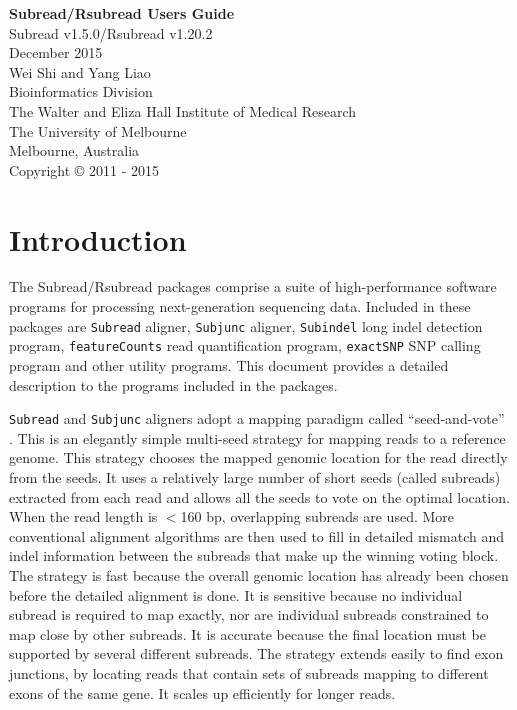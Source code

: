 \documentclass[12pt]{report}
\newcommand{\code}[1]{{\small\texttt{#1}}}
\begin{document}
\begin{titlepage}

\begin{center}
{\Huge\bf Subread/Rsubread Users Guide}\\
\vspace{1 cm}
{\centering\large Subread v1.5.0/Rsubread v1.20.2\\}
\vspace{1 cm}
 December 2015\\
\vspace{5 cm}
\Large Wei Shi and Yang Liao\\
\vspace{1 cm}
\small
{\large Bioinformatics Division\\
The Walter and Eliza Hall Institute of Medical Research\\
The University of Melbourne\\
Melbourne, Australia\\}
\vspace{7 cm}
\centering Copyright \small{\copyright}  2011 - 2015\\
\end{center}

\end{titlepage}

\tableofcontents

\chapter{Introduction}

The Subread/Rsubread packages comprise a suite of high-performance software programs for processing next-generation sequencing data.
Included in these packages are \code{Subread} aligner, \code{Subjunc} aligner, \code{Subindel} long indel detection program, \code{featureCounts} read quantification program, \code{exactSNP} SNP calling program and other utility programs.
This document provides a detailed description to the programs included in the packages.

\code{Subread} and \code{Subjunc} aligners adopt a mapping paradigm called ``seed-and-vote'' \cite{liao}.
This is an elegantly simple multi-seed strategy for mapping reads to a reference genome. 
This strategy chooses the mapped genomic location for the read directly from the seeds.
It uses a relatively large number of short seeds (called subreads) extracted from each read and allows all the seeds to vote on the optimal location.
When the read length is $<$160 bp, overlapping subreads are used.
More conventional alignment algorithms are then used to fill in detailed mismatch and indel information between the subreads that make up the winning voting block.
The strategy is fast because the overall genomic location has already been chosen before the detailed alignment is done.
It is sensitive because no individual subread is required to map exactly, nor are individual subreads constrained to map close by other subreads.
It is accurate because the final location must be supported by several different subreads. The strategy extends easily to find exon junctions, by locating reads that contain sets of subreads mapping to different exons of the same gene.
It scales up efficiently for longer reads.
\end{document}
